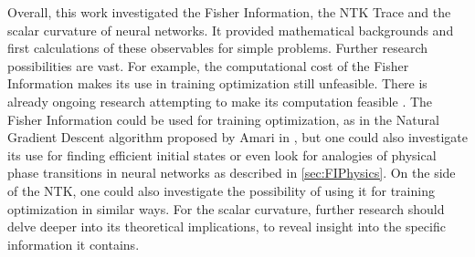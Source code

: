 Overall, this work investigated the Fisher Information, the NTK Trace and the scalar curvature of neural networks. It provided mathematical backgrounds and first calculations of these observables for simple problems. Further research possibilities are vast. For example, the computational cost of the Fisher Information makes its use in training optimization still unfeasible. There is already ongoing research attempting to make its computation feasible \cite{EfficientFisherResearch}. The Fisher Information could be used for training optimization, as in the Natural Gradient Descent algorithm proposed by Amari in \cite{NGDWorksEfficiently}, but one could also investigate its use for finding efficient initial states or even look for analogies of physical phase transitions in neural networks as described in \cref{sec:FIPhysics}. On the side of the NTK, one could also investigate the possibility of using it for training optimization in similar ways. For the scalar curvature, further research should delve deeper into its theoretical implications, to reveal insight into the specific information it contains. 
